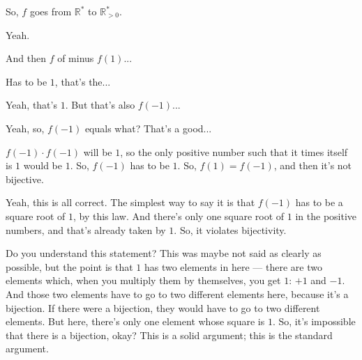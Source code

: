 \begin{student}
So, $f$ goes from $\mathbb{R}^*$ to $\mathbb{R}^*_{>0}$.
\end{student}

\begin{speech}[00:16:36 - 00:16:40]
Yeah. 
\end{speech}

\begin{student}
And then $f$ of minus $f(1)$...
\end{student}

\begin{speech}[00:16:42 - 00:16:45]
Has to be $1$, that's the... 
\end{speech}

\begin{student}
Yeah, that's $1$. But that's also $f(-1)$...
\end{student}

\begin{speech}[00:16:47 - 00:16:50]
Yeah, so, $f(-1)$ equals what? That's a good... 
\end{speech}

\begin{student}
$f(-1) \cdot f(-1)$ will be $1$, so the only positive number such that it times itself is $1$ would be $1$. So, $f(-1)$ has to be $1$. So, $f(1) = f(-1)$, and then it's not bijective.
\end{student}

\begin{speech}[00:17:10 - 00:18:00]
Yeah, this is all correct. The simplest way to say it is that $f(-1)$ has to be a square root of $1$,  by this law. And there's only one square root of $1$ in the positive numbers, and that's already taken by $1$. So, it violates bijectivity.

Do you understand this statement? This was maybe not said as clearly as possible, but the point is that $1$ has two elements in here --- there are two elements which, when you multiply them by themselves, you get $1$: $+1$ and $-1$. And those two elements have to go to two different elements here, because it's a bijection. If there were a bijection, they would have to go to two different elements. But here, there's only one element whose square is $1$. So, it's impossible that there is a bijection, okay? This is a solid argument; this is the standard argument.
\end{speech}

